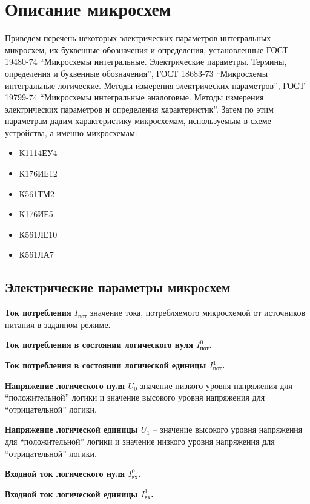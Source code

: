 \section{Описание микросхем}

Приведем перечень некоторых электрических параметров интегральных микросхем, их буквенные обозначения и определения, установленные ГОСТ 19480-74 “Микросхемы интегральные. Электрические параметры. Термины, определения и буквенные обозначения”, ГОСТ 18683-73 “Микросхемы интегральные логические. Методы измерения электрических параметров”, ГОСТ 19799-74 “Микросхемы интегральные аналоговые. Методы измерения электрических параметров и определения характеристик”. Затем по этим параметрам дадим характеристику микросхемам, используемым в схеме устройства, а именно микросхемам:

\begin{itemize}
	\item К1114ЕУ4
	\item К176ИЕ12
	\item К561ТМ2
	\item К176ИЕ5
	\item К561ЛЕ10
	\item К561ЛА7
\end{itemize}

\subsection*{Электрические параметры микросхем}

\textbf{Ток потребления $I_{\text{пот}}$} \longndash значение тока, потребляемого микросхемой от источников питания в заданном режиме. 

\textbf{Ток потребления в состоянии логического нуля $I_{\text{пот}}^{0}$.} 

\textbf{Ток потребления в состоянии логической единицы $I_{\text{пот}}^{1}$.} 

\textbf{Напряжение логического нуля $U_0$} \longndash значение низкого уровня напряжения для “положительной” логики и значение высокого уровня напряжения для “отрицательной” логики. 

\textbf{Напряжение логической единицы $U_1$} – значение высокого уровня напряжения для “положительной” логики и значение низкого уровня напряжения для “отрицательной” логики. 

\textbf{Входной ток логического нуля $I_{\text{вх}}^{0}$.}

\textbf{Входной ток логической единицы $I_{\text{вх}}^{1}$.}

